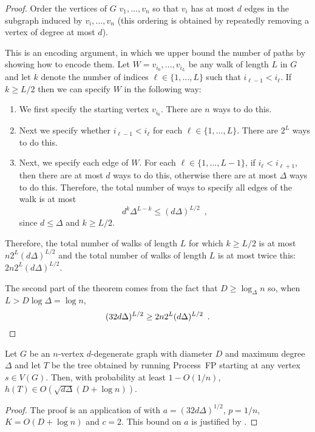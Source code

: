 \documentclass[lotsofwhite]{patmorin}
\begin{document}
\begin{proof}
   Order the vertices of $G$ $v_1,\ldots,v_n$ so that $v_i$ has at most
   $d$ edges in the subgraph induced by $v_i,\ldots,v_n$ (this ordering
   is obtained by repeatedly removing a vertex of degree at most $d$).

   This is an encoding argument, in which we upper bound the number of
   paths by showing how to encode them.
   Let $W=v_{i_0},\ldots,v_{i_L}$ be any walk of length $L$ in $G$ and
   let $k$ denote the number of indices $\ell\in\{1,\ldots,L\}$ such that $i_{\ell-1}
   < i_{\ell}$.  
   If $k\ge L/2$ then we can specify $W$ in the following way:
   \begin{enumerate}
     \item We first specify the starting vertex $v_{i_0}$.  There are $n$
       ways to do this.
     \item Next we specify whether $i_{\ell-1} < i_{\ell}$ for each
       $\ell\in\{1,\ldots,L\}$.  There are $2^L$ ways to do this.
     \item Next, we specify each edge of $W$.  For each
       $\ell\in\{1,\ldots,L-1\}$, if $i_{\ell} < i_{\ell+1}$,
       then there are at most $d$ ways to do this, otherwise there are at most $\Delta$
       ways to do this.
      Therefore, the total number of ways to specify all edges of the walk
      is at most  
      \[   d^k\Delta^{L-k} \le (d\Delta)^{L/2}  \enspace ,\]
      since $d\le \Delta$ and $k\ge L/2$.
   \end{enumerate}
   Therefore, the total number of walks of length $L$ for which $k\ge
   L/2$ is at most $n2^L(d\Delta)^{L/2}$ and the total number of walks
   of length $L$ is at most twice this: $2n2^L(d\Delta)^{L/2}$.

   The second part of the theorem comes from the fact that $D\ge
   \log_\Delta n$ so, when $L>D\log\Delta=\log n$,
   \[ (32d\Delta)^{L/2} \ge 2n2^L(d\Delta)^{L/2} \enspace . \qedhere \]
\end{proof}

\begin{thm}
  Let $G$ be an $n$-vertex $d$-degenerate graph with diameter $D$ and
  maximum degree $\Delta$ and let $T$ be the tree obtained
  by running Process~FP starting at any vertex $s\in V(G)$.  Then,
  with probability at least $1-O(1/n)$, $h(T)\in O(\sqrt{d\Delta}(D+\log n))$.
\end{thm}

\begin{proof}
  The proof is an application of  with
  $a=(32d\Delta)^{1/2}$, $p=1/n$, $K=O(D+\log n)$ and $c=2$. This bound
  on $a$ is justified by .
\end{proof}
\end{document}

